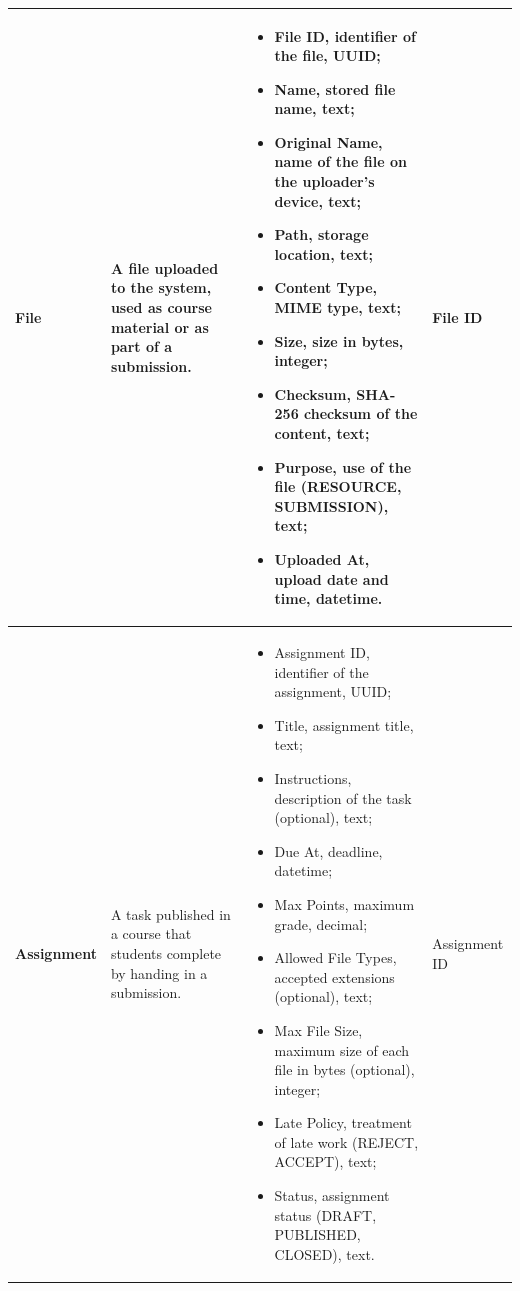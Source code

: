 {\begin{longtable}{|p{}|p{}|p{}|p{}|}
    \textbf{File} & A file uploaded to the system, used as course material or as part of a submission. &
    \begin{itemize}[leftmargin=*,nosep,before=\vspace{-\baselineskip}\leavevmode,after=\vspace{-\baselineskip}]
        \item File ID, identifier of the file, UUID;
        \item Name, stored file name, text;
        \item Original Name, name of the file on the uploader's device, text;
        \item Path, storage location, text;
        \item Content Type, MIME type, text;
        \item Size, size in bytes, integer;
        \item Checksum, SHA-256 checksum of the content, text;
        \item Purpose, use of the file (RESOURCE, SUBMISSION), text;
        \item Uploaded At, upload date and time, datetime.
    \end{itemize}
    & File ID \\ \hline

    \textbf{Assignment} & A task published in a course that students complete by handing in a submission. &
    \begin{itemize}[leftmargin=*,nosep,before=\vspace{-\baselineskip}\leavevmode,after=\vspace{-\baselineskip}]
        \item Assignment ID, identifier of the assignment, UUID;
        \item Title, assignment title, text;
        \item Instructions, description of the task (optional), text;
        \item Due At, deadline, datetime;
        \item Max Points, maximum grade, decimal;
        \item Allowed File Types, accepted extensions (optional), text;
        \item Max File Size, maximum size of each file in bytes (optional), integer;
        \item Late Policy, treatment of late work (REJECT, ACCEPT), text;
        \item Status, assignment status (DRAFT, PUBLISHED, CLOSED), text.
    \end{itemize}
    & Assignment ID \\ \hline


\end{longtable}}
